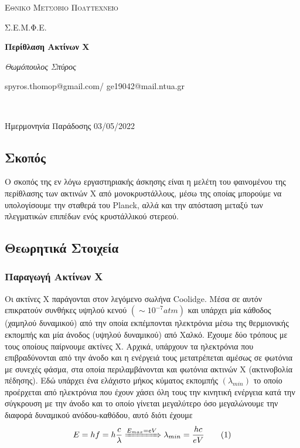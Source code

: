 \documentclass[a4paper]{article}
\newcommand\numberthis{\addtocounter{equation}{1}\tag{\theequation}}
\begin{document}
\begin{titlepage}			%
	\centering
	{\scshape\LARGE Εθνικό Μετσόβιο Πολυτεχνείο\par}
	{\scshape \LARGE Σ.Ε.Μ.Φ.Ε.\par}
	\vspace{1cm}
	{\huge\bfseries Περίθλαση Ακτίνων X \par}
	\vspace{1cm}
	{\Large\itshape Θωμόπουλος Σπύρος\par}		%
	
	{\large spyros.thomop@gmail.com/ ge19042@mail.ntua.gr\par \hfill \\}%
	\vspace{1cm}
	{\large Ημερμονηνία Παράδοσης 03/05/2022\par}
\end{titlepage}


\subsection*{Σκοπός}	
	Ο σκοπός της εν λόγω εργαστηριακής άσκησης είναι η μελέτη του φαινομένου της περίθλασης των ακτινών Χ από μονοκρυστάλλους, μέσω της οποίας μπορούμε να υπολογίσουμε την σταθερά του Planck, αλλά και την απόσταση μεταξύ των πλεγματικών επιπέδων ενός κρυστάλλικού στερεού.
	
\subsection*{Θεωρητικά Στοιχεία}
	\subsubsection*{Παραγωγή Ακτίνων Χ}
	
		Οι ακτίνες Χ παράγονται στον λεγόμενο σωλήνα Coolidge. Μέσα σε αυτόν επικρατούν συνθήκες υψηλού κενού $(\sim10^{-7}atm)$ και υπάρχει μία κάθοδος (χαμηλού δυναμικού) από την οποία εκπέμπονται ηλεκτρόνια μέσω της θερμιονικής εκπομπής και μία άνοδος (υψηλού δυναμικού) από Χαλκό. Έχουμε δύο τρόπους με τους οποίους παίρνουμε ακτίνες Χ. Αρχικά, υπάρχουν τα ηλεκτρόνια που επιβραδύνονται από την άνοδο και η ενέργειά τους μετατρέπεται αμέσως σε φωτόνια με συνεχές φάσμα, στα οποία περιλαμβάνονται και φωτόνια ακτινών Χ (ακτινοβολία πέδησης). Εδώ υπάρχει ένα ελάχιστο μήκος κύματος εκπομπής $(\lambda_{min})$ το οποίο προέρχεται από ηλεκτρόνια που έχουν χάσει όλη τους την κινητική ενέργεια κατά την σύγκρουση με την άνοδο και το οποίο γίνεται μεγαλύτερο όσο μεγαλώνουμε την διαφορά δυναμικού ανόδου-καθόδου, αυτό διότι έχουμε 
		\begin{align*}\label{1}
			E = h f = h \frac{c}{\lambda} \xRightarrow{E_{max}=eV} \lambda_{min} = \frac{hc}{eV} \numberthis
		\end{align*}
		
\end{document}
